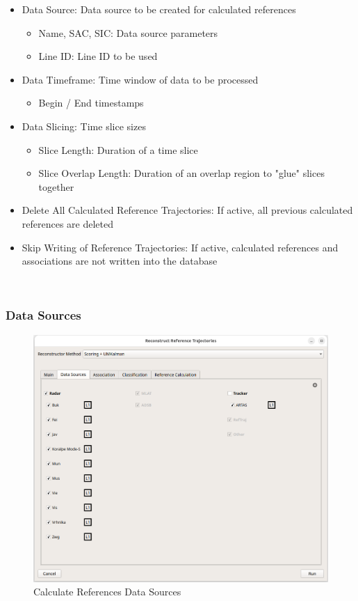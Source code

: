\begin{itemize}
\item Data Source: Data source to be created for calculated references
    \begin{itemize}
    \item Name, SAC, SIC: Data source parameters
    \item Line ID: Line ID to be used
    \end{itemize}
\item Data Timeframe: Time window of data to be processed
    \begin{itemize}
    \item Begin / End timestamps
    \end{itemize}
\item Data Slicing: Time slice sizes
    \begin{itemize}
    \item Slice Length: Duration of a time slice
    \item Slice Overlap Length: Duration of an overlap region to "glue" slices together
    \end{itemize}
\item Delete All Calculated Reference Trajectories: If active, all previous calculated references are deleted
\item Skip Writing of Reference Trajectories: If active, calculated references and associations are not written into the database
\end{itemize}
\ \\

\subsubsection{Data Sources}

\begin{figure}[H]
    \center
      \includegraphics[width=16cm]{figures/dialog_data_sources.png}
    \caption{Calculate References Data Sources}
\end{figure}

